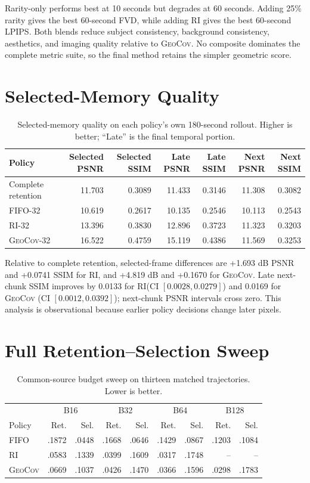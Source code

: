 \documentclass[10pt,twocolumn]{article}
\newcommand{\Geo}{\textsc{GeoCov}\xspace}
\newcommand{\RI}{\textsc{RI}\xspace}
\begin{document}
Rarity-only performs best at 10 seconds but degrades at 60 seconds. Adding
25\% rarity gives the best 60-second FVD, while adding \RI gives the best
60-second LPIPS. Both blends reduce subject consistency, background
consistency, aesthetics, and imaging quality relative to \Geo. No composite
dominates the complete metric suite, so the final method retains the simpler
geometric score.

\section{Selected-Memory Quality}

\begin{table}[!htbp]
\centering
\caption{Selected-memory quality on each policy's own 180-second rollout.
Higher is better; ``Late'' is the final temporal portion.}
\small
\begin{tabular}{lrrrrrr}
\toprule
Policy & Selected PSNR & Selected SSIM & Late PSNR & Late SSIM & Next PSNR & Next SSIM \\
\midrule
Complete retention & 11.703 & 0.3089 & 11.433 & 0.3146 & 11.308 & 0.3082 \\
FIFO-32 & 10.619 & 0.2617 & 10.135 & 0.2546 & 10.113 & 0.2543 \\
\RI-32 & 13.396 & 0.3830 & 12.896 & 0.3723 & 11.323 & 0.3203 \\
\Geo-32 & 16.522 & 0.4759 & 15.119 & 0.4386 & 11.569 & 0.3253 \\
\bottomrule
\end{tabular}
\end{table}

Relative to complete retention, selected-frame differences are +1.693 dB PSNR
and +0.0741 SSIM for \RI, and +4.819 dB and +0.1670 for \Geo. Late next-chunk
SSIM improves by 0.0133 for \RI (CI $[0.0028,0.0279]$) and 0.0169 for \Geo
(CI $[0.0012,0.0392]$); next-chunk PSNR intervals cross zero. This analysis is
observational because earlier policy decisions change later pixels.

\section{Full Retention--Selection Sweep}

\begin{table}[!htbp]
\centering
\caption{Common-source budget sweep on thirteen matched trajectories. Lower is
better.}
\small
\begin{tabular}{lrrrrrrrr}
\toprule
& \multicolumn{2}{c}{B16} & \multicolumn{2}{c}{B32} &
\multicolumn{2}{c}{B64} & \multicolumn{2}{c}{B128} \\
Policy & Ret. & Sel. & Ret. & Sel. & Ret. & Sel. & Ret. & Sel. \\
\midrule
FIFO & .1872 & .0448 & .1668 & .0646 & .1429 & .0867 & .1203 & .1084 \\
\RI & .0583 & .1339 & .0399 & .1609 & .0317 & .1748 & -- & -- \\
\Geo & .0669 & .1037 & .0426 & .1470 & .0366 & .1596 & .0298 & .1783 \\
\bottomrule
\end{tabular}
\end{table}
\end{document}
